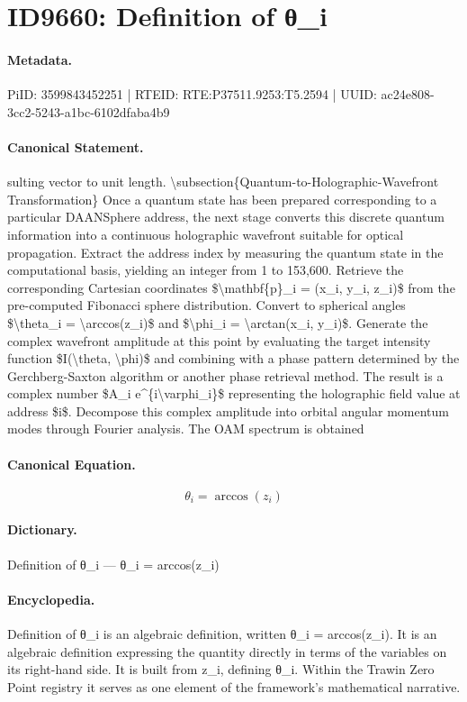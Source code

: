 \section*{ID9660: Definition of θ\_i}
\paragraph{Metadata.}
PiID: 3599843452251 | RTEID: RTE:P37511.9253:T5.2594 | UUID: ac24e808-3cc2-5243-a1bc-6102dfaba4b9

\paragraph{Canonical Statement.}
sulting vector to unit length. \textbackslash{}subsection\{Quantum-to-Holographic-Wavefront Transformation\} Once a quantum state has been prepared corresponding to a particular DAANSphere address, the next stage converts this discrete quantum information into a continuous holographic wavefront suitable for optical propagation. Extract the address index by measuring the quantum state in the computational basis, yielding an integer from 1 to 153,600. Retrieve the corresponding Cartesian coordinates \$\textbackslash{}mathbf\{p\}\_i = (x\_i, y\_i, z\_i)\$ from the pre-computed Fibonacci sphere distribution. Convert to spherical angles \$\textbackslash{}theta\_i = \textbackslash{}arccos(z\_i)\$ and \$\textbackslash{}phi\_i = \textbackslash{}arctan(x\_i, y\_i)\$. Generate the complex wavefront amplitude at this point by evaluating the target intensity function \$I(\textbackslash{}theta, \textbackslash{}phi)\$ and combining with a phase pattern determined by the Gerchberg-Saxton algorithm or another phase retrieval method. The result is a complex number \$A\_i e\textasciicircum{}\{i\textbackslash{}varphi\_i\}\$ representing the holographic field value at address \$i\$. Decompose this complex amplitude into orbital angular momentum modes through Fourier analysis. The OAM spectrum is obtained

\paragraph{Canonical Equation.}
\[
\theta_i = \arccos(z_i)
\]

\paragraph{Dictionary.}
Definition of θ\_i — θ\_i = arccos(z\_i)

\paragraph{Encyclopedia.}
Definition of θ\_i is an algebraic definition, written θ\_i = arccos(z\_i). It is an algebraic definition expressing the quantity directly in terms of the variables on its right-hand side. It is built from z\_i, defining θ\_i. Within the Trawin Zero Point registry it serves as one element of the framework's mathematical narrative.
